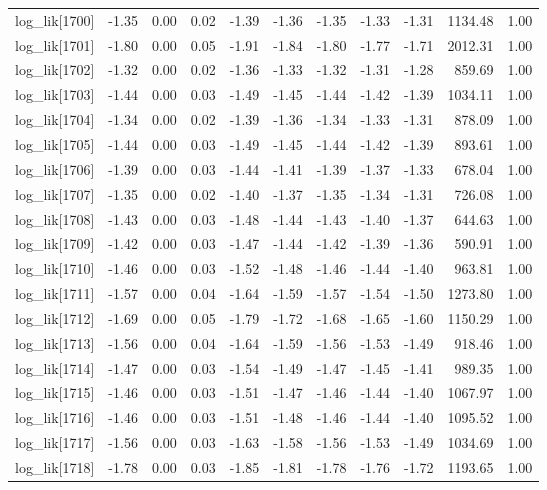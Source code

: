 \begin{table}[ht]
\begin{tabular}{rrrrrrrrrrr}
  log\_lik[1700] & -1.35 & 0.00 & 0.02 & -1.39 & -1.36 & -1.35 & -1.33 & -1.31 & 1134.48 & 1.00 \\ 
  log\_lik[1701] & -1.80 & 0.00 & 0.05 & -1.91 & -1.84 & -1.80 & -1.77 & -1.71 & 2012.31 & 1.00 \\ 
  log\_lik[1702] & -1.32 & 0.00 & 0.02 & -1.36 & -1.33 & -1.32 & -1.31 & -1.28 & 859.69 & 1.00 \\ 
  log\_lik[1703] & -1.44 & 0.00 & 0.03 & -1.49 & -1.45 & -1.44 & -1.42 & -1.39 & 1034.11 & 1.00 \\ 
  log\_lik[1704] & -1.34 & 0.00 & 0.02 & -1.39 & -1.36 & -1.34 & -1.33 & -1.31 & 878.09 & 1.00 \\ 
  log\_lik[1705] & -1.44 & 0.00 & 0.03 & -1.49 & -1.45 & -1.44 & -1.42 & -1.39 & 893.61 & 1.00 \\ 
  log\_lik[1706] & -1.39 & 0.00 & 0.03 & -1.44 & -1.41 & -1.39 & -1.37 & -1.33 & 678.04 & 1.00 \\ 
  log\_lik[1707] & -1.35 & 0.00 & 0.02 & -1.40 & -1.37 & -1.35 & -1.34 & -1.31 & 726.08 & 1.00 \\ 
  log\_lik[1708] & -1.43 & 0.00 & 0.03 & -1.48 & -1.44 & -1.43 & -1.40 & -1.37 & 644.63 & 1.00 \\ 
  log\_lik[1709] & -1.42 & 0.00 & 0.03 & -1.47 & -1.44 & -1.42 & -1.39 & -1.36 & 590.91 & 1.00 \\ 
  log\_lik[1710] & -1.46 & 0.00 & 0.03 & -1.52 & -1.48 & -1.46 & -1.44 & -1.40 & 963.81 & 1.00 \\ 
  log\_lik[1711] & -1.57 & 0.00 & 0.04 & -1.64 & -1.59 & -1.57 & -1.54 & -1.50 & 1273.80 & 1.00 \\ 
  log\_lik[1712] & -1.69 & 0.00 & 0.05 & -1.79 & -1.72 & -1.68 & -1.65 & -1.60 & 1150.29 & 1.00 \\ 
  log\_lik[1713] & -1.56 & 0.00 & 0.04 & -1.64 & -1.59 & -1.56 & -1.53 & -1.49 & 918.46 & 1.00 \\ 
  log\_lik[1714] & -1.47 & 0.00 & 0.03 & -1.54 & -1.49 & -1.47 & -1.45 & -1.41 & 989.35 & 1.00 \\ 
  log\_lik[1715] & -1.46 & 0.00 & 0.03 & -1.51 & -1.47 & -1.46 & -1.44 & -1.40 & 1067.97 & 1.00 \\ 
  log\_lik[1716] & -1.46 & 0.00 & 0.03 & -1.51 & -1.48 & -1.46 & -1.44 & -1.40 & 1095.52 & 1.00 \\ 
  log\_lik[1717] & -1.56 & 0.00 & 0.03 & -1.63 & -1.58 & -1.56 & -1.53 & -1.49 & 1034.69 & 1.00 \\ 
  log\_lik[1718] & -1.78 & 0.00 & 0.03 & -1.85 & -1.81 & -1.78 & -1.76 & -1.72 & 1193.65 & 1.00 \\ 

\end{tabular}
\end{table}

